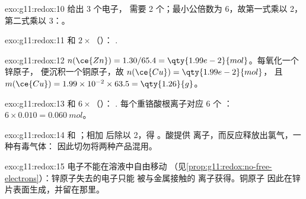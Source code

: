 \begin{solution}{exo:g11:redox:10}
 给出 3 个电子，
需要 2 个；最小公倍数为 6，故第一式乘以
2，第二式乘以 3：。
\end{solution}

\begin{solution}{exo:g11:redox:11}
 和 $2\times$（）：
.
\end{solution}

\begin{solution}{exo:g11:redox:12}
$n(\ce{Zn}) = 1.30/65.4 = \qty{1.99e-2}{mol}$。每氧化一个锌原子，
便沉积一个铜原子，故 $n(\ce{Cu}) = \qty{1.99e-2}{mol}$，
且 $m(\ce{Cu}) = 1.99\times 10^{-2} \times 63.5 = \qty{1.26}{g}$。
\end{solution}

\begin{solution}{exo:g11:redox:13}
 和
$6\times$（）：
.
每个重铬酸根离子对应 6 个 ：$6 \times 0.010 = \qty{0.060}{mol}$。
\end{solution}

\begin{solution}{exo:g11:redox:14}
 和 ；相加
后除以 2，得 。酸提供
 离子，而反应释放出氯气，一种有毒气体：
因此切勿将两种产品混用。
\end{solution}

\begin{solution}{exo:g11:redox:15}
电子不能在溶液中自由移动
（见\cref{prop:g11:redox:no-free-electrons}）：锌原子失去的电子只能
被与金属接触的  离子获得。铜原子
因此在锌片表面生成，并留在那里。
\end{solution}

